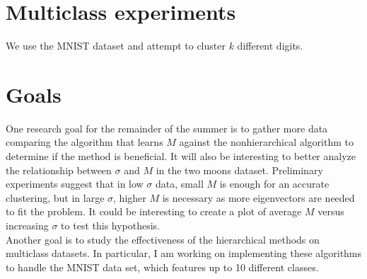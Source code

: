 \documentclass{siamart1116}
\begin{document}
\section{Multiclass experiments}
    We use the MNIST dataset and attempt to cluster $k$ different digits.

\section{Goals}
    One research goal for the remainder of the summer is to gather more data comparing the algorithm that learns $M$ against the nonhierarchical algorithm to determine if the method is beneficial. It will also be interesting to better analyze the relationship between $\sigma$ and $M$ in the two moons dataset. Preliminary experiments suggest that in low $\sigma$ data, small $M$ is enough for an accurate clustering, but in large $\sigma$, higher $M$ is necessary as more eigenvectors are needed to fit the problem. It could be interesting to create a plot of average $M$ versus increasing $\sigma$ to test this hypothesis. \\
    Another goal is to study the effectiveness of the hierarchical methods on multiclass datasets. In particular, I am working on implementing these algorithms to handle the MNIST data set, which features up to 10 different classes.



\end{document}
